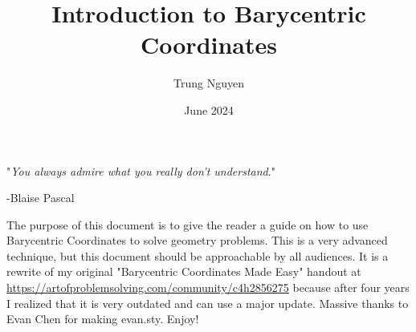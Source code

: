 \documentclass[11pt]{scrartcl}
\begin{document}
\title{Introduction to Barycentric Coordinates}
\author{Trung Nguyen}
\date{June 2024}
\maketitle

\begin{center}
    "\textit{You always admire what you really don't understand}."
    
    -Blaise Pascal
\end{center}



The purpose of this document is to give the reader a guide on how to use Barycentric Coordinates to solve geometry problems. This is a very advanced technique, but this document should be approachable by all audiences. It is a rewrite of my original "Barycentric Coordinates Made Easy" handout at \url{https://artofproblemsolving.com/community/c4h2856275} because after four years I realized that it is very outdated and can use a major update. Massive thanks to Evan Chen for making evan.sty. Enjoy! 


\end{document}
